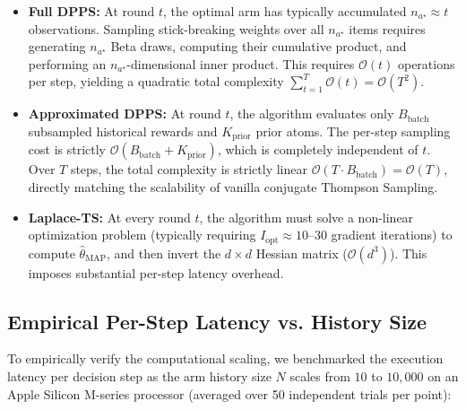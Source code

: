 \documentclass[twoside]{article}
\begin{document}
\begin{itemize}
    \item \textbf{Full DPPS:} At round $t$, the optimal arm has typically accumulated $n_{a^\star} \approx t$ observations. Sampling stick-breaking weights over all $n_{a^\star}$ items requires generating $n_{a^\star}$ Beta draws, computing their cumulative product, and performing an $n_{a^\star}$-dimensional inner product. This requires $\mathcal{O}(t)$ operations per step, yielding a quadratic total complexity $\sum_{t=1}^T \mathcal{O}(t) = \mathcal{O}(T^2)$.
    \item \textbf{Approximated DPPS:} At round $t$, the algorithm evaluates only $B_{\text{batch}}$ subsampled historical rewards and $K_{\text{prior}}$ prior atoms. The per-step sampling cost is strictly $\mathcal{O}(B_{\text{batch}} + K_{\text{prior}})$, which is completely independent of $t$. Over $T$ steps, the total complexity is strictly linear $\mathcal{O}(T \cdot B_{\text{batch}}) = \mathcal{O}(T)$, directly matching the scalability of vanilla conjugate Thompson Sampling.
    \item \textbf{Laplace-TS:} At every round $t$, the algorithm must solve a non-linear optimization problem (typically requiring $I_{\text{opt}} \approx 10\text{--}30$ gradient iterations) to compute $\hat{\theta}_{\text{MAP}}$, and then invert the $d \times d$ Hessian matrix ($\mathcal{O}(d^3)$). This imposes substantial per-step latency overhead.
\end{itemize}

\subsection{Empirical Per-Step Latency vs. History Size}
To empirically verify the computational scaling, we benchmarked the execution latency per decision step as the arm history size $N$ scales from $10$ to $10{,}000$ on an Apple Silicon M-series processor (averaged over 50 independent trials per point):
\end{document}
